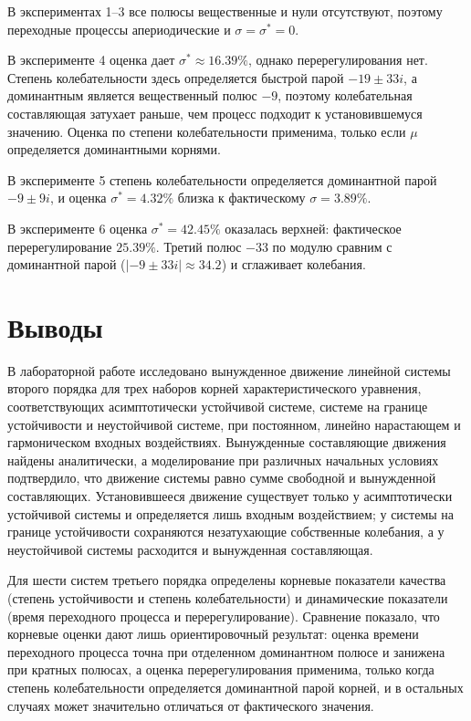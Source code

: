 \documentclass[a4paper, 12pt]{article}
\begin{document}
В экспериментах 1--3 все полюсы вещественные и нули отсутствуют, поэтому переходные процессы апериодические и $\sigma = \sigma^* = 0$.

В эксперименте 4 оценка дает $\sigma^* \approx 16.39\%$, однако перерегулирования нет. Степень колебательности здесь определяется быстрой парой $-19 \pm 33i$, а доминантным является вещественный полюс $-9$, поэтому колебательная составляющая затухает раньше, чем процесс подходит к установившемуся значению. Оценка по степени колебательности применима, только если $\mu$ определяется доминантными корнями.

В эксперименте 5 степень колебательности определяется доминантной парой $-9 \pm 9i$, и оценка $\sigma^* = 4.32\%$ близка к фактическому $\sigma = 3.89\%$.

В эксперименте 6 оценка $\sigma^* = 42.45\%$ оказалась верхней: фактическое перерегулирование $25.39\%$. Третий полюс $-33$ по модулю сравним с доминантной парой ($|-9 \pm 33i| \approx 34.2$) и сглаживает колебания.
\newpage


\section{Выводы}
В лабораторной работе исследовано вынужденное движение линейной системы второго порядка для трех наборов корней характеристического уравнения, соответствующих асимптотически устойчивой системе, системе на границе устойчивости и неустойчивой системе, при постоянном, линейно нарастающем и гармоническом входных воздействиях. Вынужденные составляющие движения найдены аналитически, а моделирование при различных начальных условиях подтвердило, что движение системы равно сумме свободной и вынужденной составляющих. Установившееся движение существует только у асимптотически устойчивой системы и определяется лишь входным воздействием; у системы на границе устойчивости сохраняются незатухающие собственные колебания, а у неустойчивой системы расходится и вынужденная составляющая.

Для шести систем третьего порядка определены корневые показатели качества (степень устойчивости и степень колебательности) и динамические показатели (время переходного процесса и перерегулирование). Сравнение показало, что корневые оценки дают лишь ориентировочный результат: оценка времени переходного процесса точна при отделенном доминантном полюсе и занижена при кратных полюсах, а оценка перерегулирования применима, только когда степень колебательности определяется доминантной парой корней, и в остальных случаях может значительно отличаться от фактического значения.
\end{document}
